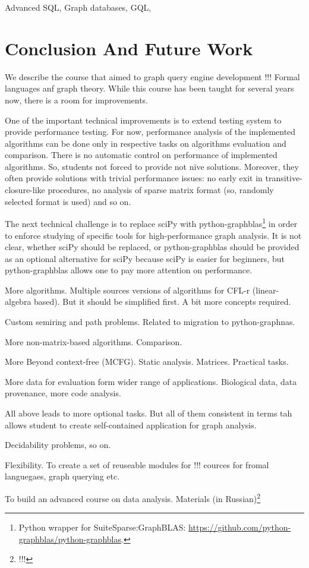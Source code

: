 \documentclass[sigconf]{acmart}
\begin{document}
Advanced SQL, Graph databases, GQL, 

\section{Conclusion And Future Work}

We describe the course that aimed to graph query engine development !!! 
Formal languages anf graph theory.
While this course has been taught for several years now, there is a room for improvements.

One of the important technical improvements is to extend testing system to provide performance testing. 
For now, performance analysis of the implemented algorithms can be done only in respective tasks on algorithms evaluation and comparison.
There is no automatic control on performance of implemented algorithms. 
So, students not forced to provide not n\"ive solutions.
Moreover, they often provide solutions with trivial performance issues: no early exit in transitive-closure-like procedures, no analysis of sparse matrix format (so, randomly selected format is used) and so on.

The next technical challenge is to replace sciPy with python-graphblas\footnote{Python wrapper for SuiteSparse:GraphBLAS: \url{https://github.com/python-graphblas/python-graphblas}.} in order to enforce studying of specific tools for high-performance graph analysis. 
It is not clear, whether sciPy should be replaced, or python-graphblas should be provided as an optional alternative for sciPy because sciPy is easier for beginners, but python-graphblas allows one to pay more attention on performance.

More algorithms.
Multiple sources versions of algorithms for CFL-r (linear-algebra based).
But it should be simplified first.
A bit more concepts required.

Custom semiring and path problems.
Related to migration to python-graphnas.

More non-matrix-based algorithms. Comparison.

More Beyond context-free (MCFG). 
Static analysis.
Matrices. 
Practical tasks.

More data for evaluation form wider range of applications.
Biological data, data provenance, more code analysis.

All above leads to more optional tasks.
But all of them consistent in terms tah allows student to create self-contained application for graph analysis.

Decidability problems, so on.

Flexibility. 
To create a set of reuseable modules for !!! cources for fromal languegaes, graph querying etc.

To build an advanced course on data analysis. 
Materials (in Russian)\footnote{!!!}



\end{document}
